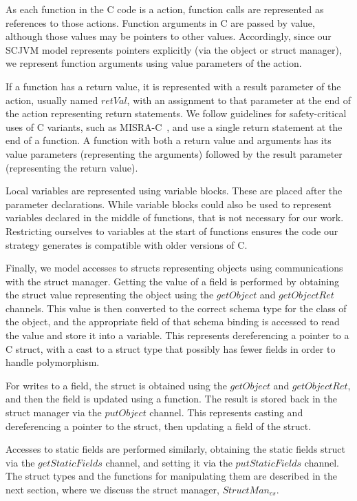 As each function in the C code is a \Circus{} action, function calls
are represented as references to those actions.
Function arguments in C are passed by value, although those values may
be pointers to other values.
Accordingly, since our SCJVM model represents pointers explicitly (via
the object or struct manager), we represent function arguments using
value parameters of the \Circus{} action.

If a function has a return value, it is represented with a result
parameter of the \Circus{} action, usually named $retVal$, with an
assignment to that parameter at the end of the action representing
return statements.
We follow guidelines for safety-critical uses of C variants, such as
MISRA-C~\cite{MISRA}, and use a single return statement at the end of
a function.
A function with both a return value and arguments has its value
parameters (representing the arguments) followed by the result
parameter (representing the return value).

Local variables are represented using \Circus{} variable blocks.
These are placed after the parameter declarations.
While \Circus{} variable blocks could also be used to represent
variables declared in the middle of functions, that is not necessary
for our work.
Restricting ourselves to variables at the start of functions ensures
the code our strategy generates is compatible with older versions of
C.

Finally, we model accesses to structs representing objects using
communications with the struct manager.
Getting the value of a field is performed by obtaining the struct
value representing the object using the $getObject$ and $getObjectRet$
channels.
This value is then converted to the correct schema type for the class
of the object, and the appropriate field of that schema binding is
accessed to read the value and store it into a variable.
This represents dereferencing a pointer to a C struct, with a cast to
a struct type that possibly has fewer fields in order to handle
polymorphism.

For writes to a field, the struct is obtained using the $getObject$
and $getObjectRet$, and then the field is updated using a function.
The result is stored back in the struct manager via the $putObject$
channel.
This represents casting and dereferencing a pointer to the struct,
then updating a field of the struct.

Accesses to static fields are performed similarly, obtaining the
static fields struct via the $getStaticFields$ channel, and setting it
via the $putStaticFields$ channel.
The struct types and the functions for manipulating them are described
in the next section, where we discuss the struct manager,
$StructMan_{cs}$.

